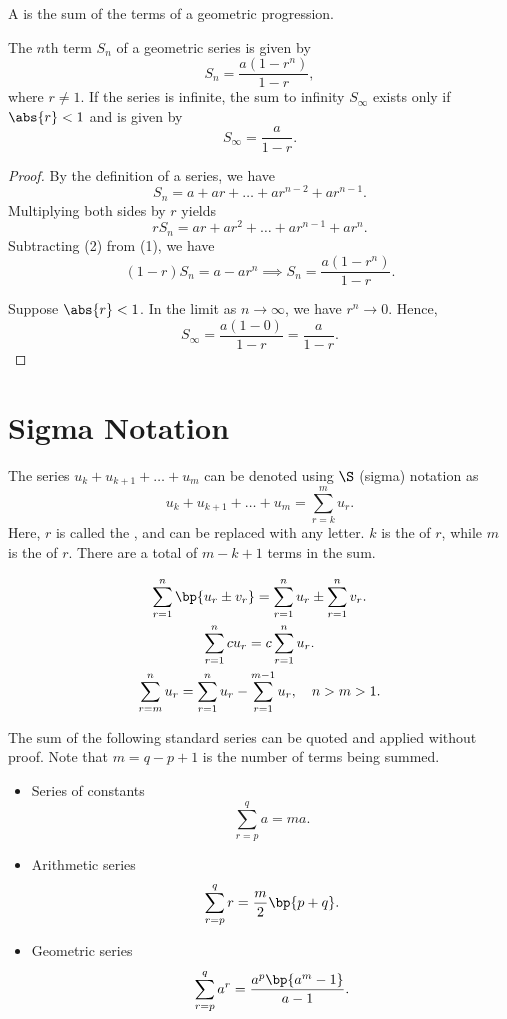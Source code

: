 \begin{definition}
    A  is the sum of the terms of a geometric progression.
\end{definition}

\begin{proposition}
    The $n$th term $S_n$ of a geometric series is given by \[S_n = \frac{a(1 - r^n)}{1 - r},\] where $r \neq 1$. If the series is infinite, the sum to infinity $S_\infty$ exists only if $\abs{r} < 1$ and is given by \[S_\infty = \frac{a}{1 - r}.\]
\end{proposition}
\begin{proof}
    By the definition of a series, we have \[S_n = a + ar + \dots + ar^{n-2} + ar^{n-1}. \tag{1}\] Multiplying both sides by $r$ yields \[r S_n = ar + ar^2 + \dots + ar^{n-1} + ar^{n}. \tag{2}\] Subtracting (2) from (1), we have \[(1-r)S_n = a - ar^{n} \implies S_n = \frac{a(1 - r^{n})}{1 - r}.\]
    
    Suppose $\abs{r} < 1$. In the limit as $n \to \infty$, we have $r^n \to 0$. Hence, \[S_\infty = \frac{a(1 - 0)}{1 - r} = \frac{a}{1-r}.\]
\end{proof}

\clearpage
\section{Sigma Notation}

\begin{definition}
    The series $u_k + u_{k+1} + \dots + u_m$ can be denoted using $\S$ (sigma) notation as \[u_k + u_{k+1} + \dots + u_m = \sum_{r=k}^m u_r.\] Here, $r$ is called the , and can be replaced with any letter. $k$ is the  of $r$, while $m$ is the  of $r$. There are a total of $m - k + 1$ terms in the sum.
\end{definition}

\begin{fact}
    \begin{gather*}
        \sum_{r = 1}^n \bp{u_r \pm v_r} = \sum_{r = 1}^n u_r \pm \sum_{r = 1}^n v_r.\\
        \sum_{r = 1}^n cu_r = c\sum_{r = 1}^n u_r.\\
        \sum_{r = m}^n u_r = \sum_{r = 1}^n u_r - \sum_{r = 1}^{m-1} u_r, \quad n > m > 1.
    \end{gather*}
\end{fact}

\begin{fact}
    The sum of the following standard series can be quoted and applied without proof. Note that $m = q - p + 1$ is the number of terms being summed.

    \begin{itemize}
        \item Series of constants \[\sum_{r = p}^q a = ma.\]
        \item Arithmetic series \[\sum_{r = p}^q r = \frac{m}{2} \bp{p + q}.\]
        \item Geometric series \[\sum_{r = p}^q a^r = \frac{a^p \bp{a^m - 1}}{a - 1}.\]
    \end{itemize}
\end{fact}
